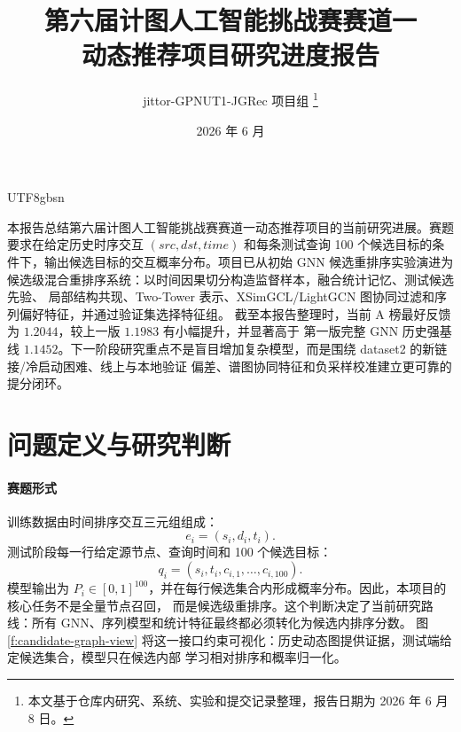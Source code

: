 \documentclass[letterpaper,11pt,leqno]{article}
\begin{document}
\begin{CJK*}{UTF8}{gbsn}

\title{第六届计图人工智能挑战赛赛道一\\动态推荐项目研究进度报告}

\author{jittor-GPNUT1-JGRec 项目组
\thanks{本文基于仓库内研究、系统、实验和提交记录整理，报告日期为 2026 年 6 月 8 日。}}

\date{2026 年 6 月}

\begin{titlepage}
\maketitle

本报告总结第六届计图人工智能挑战赛赛道一动态推荐项目的当前研究进展。赛题要求在给定历史时序交互
$(src,dst,time)$ 和每条测试查询 100 个候选目标的条件下，输出候选目标的交互概率分布。项目已从初始
GNN 候选重排序实验演进为候选级混合重排序系统：以时间因果切分构造监督样本，融合统计记忆、测试候选先验、
局部结构共现、Two-Tower 表示、XSimGCL/LightGCN 图协同过滤和序列偏好特征，并通过验证集选择特征组。
截至本报告整理时，当前 A 榜最好反馈为 $1.2044$，较上一版 $1.1983$ 有小幅提升，并显著高于
第一版完整 GNN 历史强基线 $1.1452$。下一阶段研究重点不是盲目增加复杂模型，而是围绕 dataset2 的新链接/冷启动困难、线上与本地验证
偏差、谱图协同特征和负采样校准建立更可靠的提分闭环。

\end{titlepage}

\section{问题定义与研究判断}

\paragraph{赛题形式}
训练数据由时间排序交互三元组组成：
\begin{equation}
e_i=(s_i,d_i,t_i).
\end{equation}
测试阶段每一行给定源节点、查询时间和 100 个候选目标：
\begin{equation}
q_i=(s_i,t_i,c_{i,1},\ldots,c_{i,100}).
\end{equation}
模型输出为 $P_i\in[0,1]^{100}$，并在每行候选集合内形成概率分布。因此，本项目的核心任务不是全量节点召回，
而是候选级重排序。这个判断决定了当前研究路线：所有 GNN、序列模型和统计特征最终都必须转化为候选内排序分数。
图 \ref{f:candidate-graph-view} 将这一接口约束可视化：历史动态图提供证据，测试端给定候选集合，模型只在候选内部
学习相对排序和概率归一化。


\end{CJK*}
\end{document}
